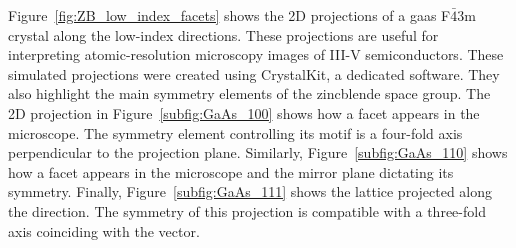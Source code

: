 Figure~\ref{fig:ZB_low_index_facets} shows the 2D projections of a \acs{gaas} F\(\bar{4}\)3m crystal along the low-index directions. These projections are useful for interpreting atomic-resolution microscopy images of III-V semiconductors. These simulated projections were created using CrystalKit, a dedicated software. They also highlight the main symmetry elements of the zincblende space group. The 2D projection in Figure~\ref{subfig:GaAs_100} shows how a  facet appears in the microscope. The symmetry element controlling its motif is a four-fold axis perpendicular to the projection plane. Similarly, Figure~\ref{subfig:GaAs_110} shows how a  facet appears in the microscope and the mirror plane dictating its symmetry. Finally, Figure~\ref{subfig:GaAs_111} shows the lattice projected along the  direction. The symmetry of this projection is compatible with a three-fold axis coinciding with the  vector.

